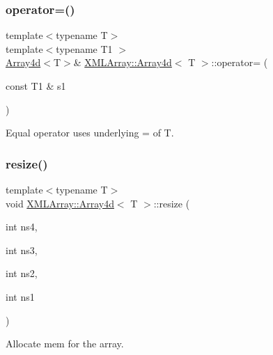 \subsubsection{\texorpdfstring{operator=()}{operator=()}\hspace{0.1cm}{\footnotesize\ttfamily [6/6]}}
{\footnotesize\ttfamily template$<$typename T$>$ \\
template$<$typename T1 $>$ \\
\mbox{\hyperlink{classXMLArray_1_1Array4d}{Array4d}}$<$T$>$\& \mbox{\hyperlink{classXMLArray_1_1Array4d}{X\+M\+L\+Array\+::\+Array4d}}$<$ T $>$\+::operator= (\begin{DoxyParamCaption}\item[{const T1 \&}]{s1 }\end{DoxyParamCaption})\hspace{0.3cm}{\ttfamily [inline]}}



Equal operator uses underlying = of T. 

\mbox{\label{classXMLArray_1_1Array4d_a8726b8005ecb501662b5e76873702480}} 
\subsubsection{\texorpdfstring{resize()}{resize()}\hspace{0.1cm}{\footnotesize\ttfamily [1/3]}}
{\footnotesize\ttfamily template$<$typename T$>$ \\
void \mbox{\hyperlink{classXMLArray_1_1Array4d}{X\+M\+L\+Array\+::\+Array4d}}$<$ T $>$\+::resize (\begin{DoxyParamCaption}\item[{int}]{ns4,  }\item[{int}]{ns3,  }\item[{int}]{ns2,  }\item[{int}]{ns1 }\end{DoxyParamCaption})\hspace{0.3cm}{\ttfamily [inline]}}



Allocate mem for the array. 

\mbox{\label{classXMLArray_1_1Array4d_a8726b8005ecb501662b5e76873702480}} 
